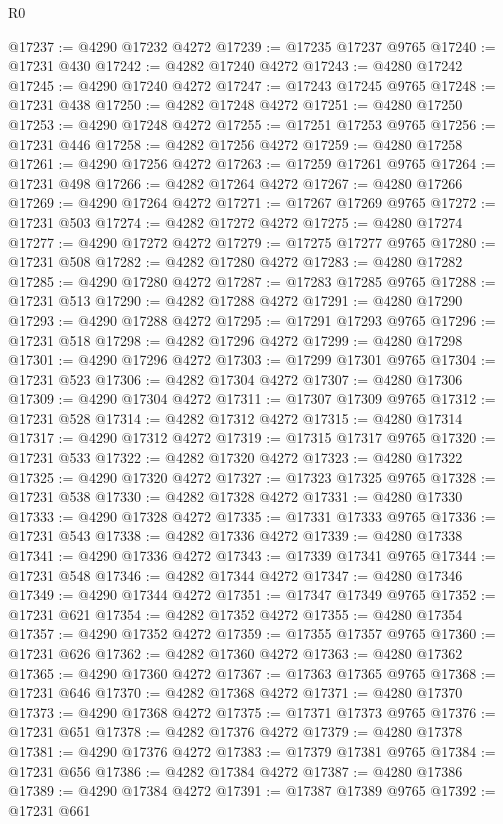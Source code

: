 \begin{lexlean}{R0}
\begin{coremodule}
@17237 := @4290 @17232 @4272
@17239 := @17235 @17237 @9765
@17240 := @17231 @430
@17242 := @4282 @17240 @4272
@17243 := @4280 @17242
@17245 := @4290 @17240 @4272
@17247 := @17243 @17245 @9765
@17248 := @17231 @438
@17250 := @4282 @17248 @4272
@17251 := @4280 @17250
@17253 := @4290 @17248 @4272
@17255 := @17251 @17253 @9765
@17256 := @17231 @446
@17258 := @4282 @17256 @4272
@17259 := @4280 @17258
@17261 := @4290 @17256 @4272
@17263 := @17259 @17261 @9765
@17264 := @17231 @498
@17266 := @4282 @17264 @4272
@17267 := @4280 @17266
@17269 := @4290 @17264 @4272
@17271 := @17267 @17269 @9765
@17272 := @17231 @503
@17274 := @4282 @17272 @4272
@17275 := @4280 @17274
@17277 := @4290 @17272 @4272
@17279 := @17275 @17277 @9765
@17280 := @17231 @508
@17282 := @4282 @17280 @4272
@17283 := @4280 @17282
@17285 := @4290 @17280 @4272
@17287 := @17283 @17285 @9765
@17288 := @17231 @513
@17290 := @4282 @17288 @4272
@17291 := @4280 @17290
@17293 := @4290 @17288 @4272
@17295 := @17291 @17293 @9765
@17296 := @17231 @518
@17298 := @4282 @17296 @4272
@17299 := @4280 @17298
@17301 := @4290 @17296 @4272
@17303 := @17299 @17301 @9765
@17304 := @17231 @523
@17306 := @4282 @17304 @4272
@17307 := @4280 @17306
@17309 := @4290 @17304 @4272
@17311 := @17307 @17309 @9765
@17312 := @17231 @528
@17314 := @4282 @17312 @4272
@17315 := @4280 @17314
@17317 := @4290 @17312 @4272
@17319 := @17315 @17317 @9765
@17320 := @17231 @533
@17322 := @4282 @17320 @4272
@17323 := @4280 @17322
@17325 := @4290 @17320 @4272
@17327 := @17323 @17325 @9765
@17328 := @17231 @538
@17330 := @4282 @17328 @4272
@17331 := @4280 @17330
@17333 := @4290 @17328 @4272
@17335 := @17331 @17333 @9765
@17336 := @17231 @543
@17338 := @4282 @17336 @4272
@17339 := @4280 @17338
@17341 := @4290 @17336 @4272
@17343 := @17339 @17341 @9765
@17344 := @17231 @548
@17346 := @4282 @17344 @4272
@17347 := @4280 @17346
@17349 := @4290 @17344 @4272
@17351 := @17347 @17349 @9765
@17352 := @17231 @621
@17354 := @4282 @17352 @4272
@17355 := @4280 @17354
@17357 := @4290 @17352 @4272
@17359 := @17355 @17357 @9765
@17360 := @17231 @626
@17362 := @4282 @17360 @4272
@17363 := @4280 @17362
@17365 := @4290 @17360 @4272
@17367 := @17363 @17365 @9765
@17368 := @17231 @646
@17370 := @4282 @17368 @4272
@17371 := @4280 @17370
@17373 := @4290 @17368 @4272
@17375 := @17371 @17373 @9765
@17376 := @17231 @651
@17378 := @4282 @17376 @4272
@17379 := @4280 @17378
@17381 := @4290 @17376 @4272
@17383 := @17379 @17381 @9765
@17384 := @17231 @656
@17386 := @4282 @17384 @4272
@17387 := @4280 @17386
@17389 := @4290 @17384 @4272
@17391 := @17387 @17389 @9765
@17392 := @17231 @661

\end{coremodule}
\end{lexlean}
